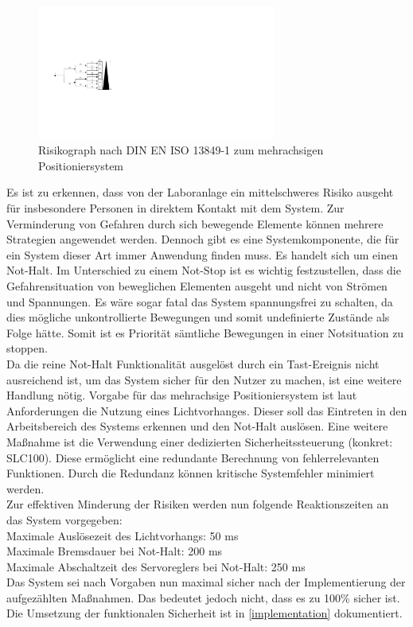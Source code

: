 \documentclass[../../../Bachelorarbeit.tex]{subfiles}
\begin{document}
\begin{figure}[H]
    \centering
    \includegraphics[width=0.7\textwidth]{Images/Risikograph.pdf}
    \caption[Risikograph]{Risikograph nach DIN EN ISO 13849-1 zum mehrachsigen Positioniersystem}
    \label{fig:my-img103}
\end{figure}

Es ist zu erkennen, dass von der Laboranlage ein mittelschweres Risiko ausgeht für insbesondere Personen in direktem Kontakt mit dem System. Zur Verminderung von Gefahren durch sich bewegende Elemente können mehrere Strategien angewendet werden. Dennoch gibt es eine Systemkomponente, die für ein System dieser Art immer Anwendung finden muss. Es handelt sich um einen Not-Halt. Im Unterschied zu einem Not-Stop ist es wichtig festzustellen, dass die Gefahrensituation von beweglichen Elementen ausgeht und nicht von Strömen und Spannungen. Es wäre sogar fatal das System spannungsfrei zu schalten, da dies mögliche unkontrollierte Bewegungen und somit undefinierte Zustände als Folge hätte. Somit ist es Priorität sämtliche Bewegungen in einer Notsituation zu stoppen.\\
Da die reine Not-Halt Funktionalität ausgelöst durch ein Tast-Ereignis nicht ausreichend ist, um das System sicher für den Nutzer zu machen, ist eine weitere Handlung nötig. Vorgabe für das mehrachsige Positioniersystem ist laut Anforderungen die Nutzung eines Lichtvorhanges. Dieser soll das Eintreten in den Arbeitsbereich des Systems erkennen und den Not-Halt auslösen. Eine weitere Maßnahme ist die Verwendung einer dedizierten Sicherheitssteuerung (konkret: \acs{SLC}100). Diese ermöglicht eine redundante Berechnung von fehlerrelevanten Funktionen. Durch die Redundanz können kritische Systemfehler minimiert werden.\\
Zur effektiven Minderung der Risiken werden nun folgende Reaktionszeiten an das System vorgegeben:\\
\bigskip \newline
Maximale Auslösezeit des Lichtvorhangs: 50 \si{ms}\\
Maximale Bremsdauer bei Not-Halt: 200 \si{ms}\\
Maximale Abschaltzeit des Servoreglers bei Not-Halt: 250 \si{ms}\\

Das System sei nach Vorgaben nun maximal sicher nach der Implementierung der aufgezählten Maßnahmen. Das bedeutet jedoch nicht, dass es zu 100\% sicher ist. Die Umsetzung der funktionalen Sicherheit ist in \autoref{implementation} dokumentiert.

\end{document}
